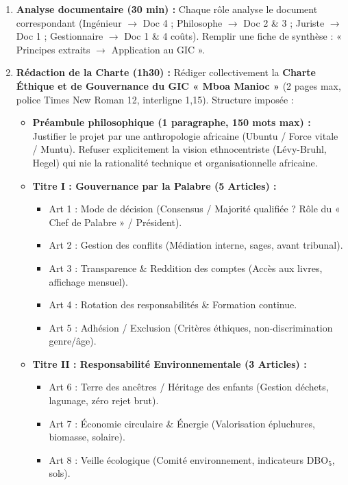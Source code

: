 \documentclass[11pt]{article}
\begin{document}
\begin{enumerate}
    \item \textbf{Analyse documentaire (30 min) :} Chaque rôle analyse le document correspondant (Ingénieur $\rightarrow$ Doc 4 ; Philosophe $\rightarrow$ Doc 2 \& 3 ; Juriste $\rightarrow$ Doc 1 ; Gestionnaire $\rightarrow$ Doc 1 \& 4 coûts). Remplir une fiche de synthèse : « Principes extraits $\rightarrow$ Application au GIC ».
    \item \textbf{Rédaction de la Charte (1h30) :} Rédiger collectivement la \textbf{Charte Éthique et de Gouvernance du GIC « Mboa Manioc »} (2 pages max, police Times New Roman 12, interligne 1,15). Structure imposée :
    \begin{itemize}
        \item \textbf{Préambule philosophique (1 paragraphe, 150 mots max) :} Justifier le projet par une anthropologie africaine (Ubuntu / Force vitale / Muntu). Refuser explicitement la vision ethnocentriste (Lévy-Bruhl, Hegel) qui nie la rationalité technique et organisationnelle africaine.
        \item \textbf{Titre I : Gouvernance par la Palabre (5 Articles) :}
        \begin{itemize}
            \item Art 1 : Mode de décision (Consensus / Majorité qualifiée ? Rôle du « Chef de Palabre » / Président).
            \item Art 2 : Gestion des conflits (Médiation interne, sages, avant tribunal).
            \item Art 3 : Transparence \& Reddition des comptes (Accès aux livres, affichage mensuel).
            \item Art 4 : Rotation des responsabilités \& Formation continue.
            \item Art 5 : Adhésion / Exclusion (Critères éthiques, non-discrimination genre/âge).
        \end{itemize}
        \item \textbf{Titre II : Responsabilité Environnementale (3 Articles) :}
        \begin{itemize}
            \item Art 6 : Terre des ancêtres / Héritage des enfants (Gestion déchets, lagunage, zéro rejet brut).
            \item Art 7 : Économie circulaire \& Énergie (Valorisation épluchures, biomasse, solaire).
            \item Art 8 : Veille écologique (Comité environnement, indicateurs DBO$_5$, sols).

\end{itemize}
\end{itemize}
\end{enumerate}
\end{document}
